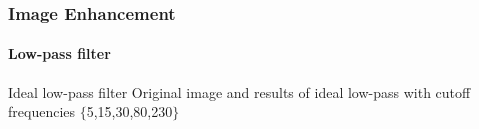 \documentclass{beamer}
\begin{document}
\begin{frame}
\frametitle{Image Enhancement}
\framesubtitle{Low-pass filter}
\begin{block}{Ideal low-pass filter}
\scriptsize{Original image and results of ideal low-pass with cutoff frequencies $\{$5,15,30,80,230$\}$}
\end{block}
\end{frame}
\end{document}
